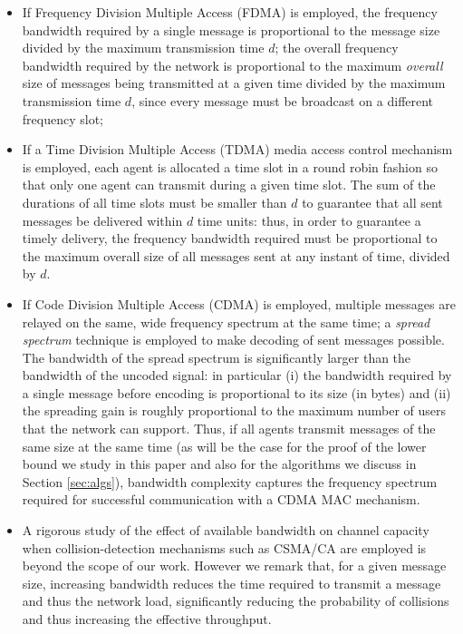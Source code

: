 \documentclass[letterpaper,10pt,conference]{ieeeconf}
\begin{document}
\begin{itemize}
\item If Frequency Division Multiple Access (FDMA) is employed, the frequency bandwidth required by a single message is proportional to the message size divided by the maximum transmission time $d$; the overall frequency bandwidth required by the network is proportional to the maximum \emph{overall} size of messages being transmitted at a given time divided by the maximum transmission time $d$, since every message must be broadcast on a different frequency slot;
\item If a Time Division Multiple Access (TDMA) media access control mechanism is employed, each agent is allocated a time slot in a round robin fashion so that only one agent can transmit during a given time slot. The sum of the durations of all time slots must be smaller than $d$ to guarantee that all sent messages be delivered within $d$ time units: thus, in order to guarantee a timely delivery, the frequency bandwidth required must be proportional to the maximum overall size of all messages sent at any instant of time, divided by $d$.
\item If Code Division Multiple Access (CDMA) is employed, multiple messages are relayed on the same, wide frequency spectrum at the same time; a \emph{spread spectrum} technique is employed to make decoding of sent messages possible. The bandwidth of the spread spectrum is significantly larger than the bandwidth of the uncoded signal: in particular (i) the bandwidth required by a single message before encoding is proportional to its size (in bytes) and (ii) the spreading gain is roughly proportional to the maximum number of users that the network can support. Thus, if all agents transmit messages of the same size at the same time (as will be the case for the proof of the lower bound we study in this paper and also for the algorithms we discuss in Section \ref{sec:algs}), bandwidth complexity captures the frequency spectrum required for successful communication with a CDMA MAC mechanism.

\item A rigorous study of the effect of available bandwidth on channel capacity when collision-detection mechanisms such as CSMA/CA are employed is beyond the scope of our work. However we remark that, for a given message size, increasing bandwidth reduces the time required to transmit a message and thus the network load, significantly reducing the probability of collisions and thus increasing the effective throughput.
\end{itemize}
\end{document}
